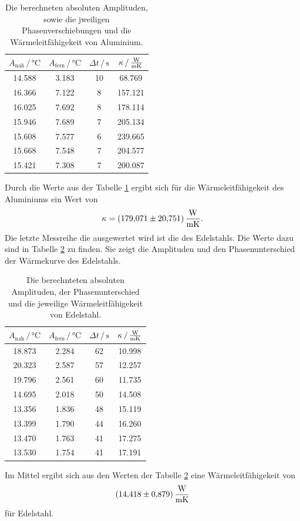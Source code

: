 \begin{table}
\centering
\caption{Die berechneten absoluten Amplituden, sowie die jweiligen Phasenverschiebungen und die Wärmeleitfähigekeit von Aluminium.}
    \begin{tabular}{cccc}
    \toprule
    $A_\text{nah} \,/\, \si{\celsius}$ & $A_\text{fern} \,/\, \si{\celsius}$ & $\Delta t \,/\, \si{\second}$ & $\kappa \, / \, \si{\frac{\watt}{\meter\kelvin}}$ \\
    \midrule
    14.588 & 3.183 & 10 & 68.769 \\
    16.366 & 7.122 & 8  & 157.121 \\
    16.025 & 7.692 & 8  & 178.114 \\
    15.946 & 7.689 & 7  & 205.134 \\
    15.608 & 7.577 & 6  & 239.665 \\
    15.668 & 7.548 & 7  & 204.577 \\
    15.421 & 7.308 & 7  & 200.087 \\
    \bottomrule
    \end{tabular}
\label{tab:erg_alu}
\end{table}
Durch die Werte aus der Tabelle \ref{tab:erg_alu} ergibt sich für die Wärmeleitfähigekeit des Aluminiums ein Wert von 
\begin{equation}
    \kappa = \SI{179.071(20751)}{\frac{\watt}{\meter\kelvin}} .
\end{equation}
\FloatBarrier
Die letzte Messreihe die ausgewertet wird ist die des Edelstahls.
Die Werte dazu sind in Tabelle \ref{tab:erg_edel} zu finden. Sie zeigt die Amplituden und den Phasenunterschied der Wärmekurve des Edelstahls.
\begin{table}
\centering
\caption{Die berechnteten absoluten Amplituden, der Phasenunterschied und die jeweilige Wärmeleitfähigekeit von Edelstahl.}
\begin{tabular}{cccc}
    \toprule
    $A_\text{nah} \,/\, \si{\celsius}$ & $A_\text{fern} \,/\, \si{\celsius}$ & $\Delta t \,/\, \si{\second}$ & $\kappa \, / \, \si{\frac{\watt}{\meter\kelvin}}$ \\
    \midrule
    18.873 & 2.284 & 62 & 10.998 \\
    20.323 & 2.587 & 57 & 12.257 \\
    19.796 & 2.561 & 60 & 11.735 \\
    14.695 & 2.018 & 50 & 14.508 \\
    13.356 & 1.836 & 48 & 15.119 \\
    13.399 & 1.790 & 44 & 16.260 \\
    13.470 & 1.763 & 41 & 17.275 \\
    13.530 & 1.754 & 41 & 17.191 \\
    \bottomrule
\end{tabular}
\label{tab:erg_edel}
\end{table}

Im Mittel ergibt sich aus den Werten der Tabelle \ref{tab:erg_edel} eine Wärmeleitfähigekeit von
\begin{equation*}
    \SI{14.418(879)}{\frac{\watt}{\meter\kelvin}}
\end{equation*} 
für Edelstahl.

\FloatBarrier